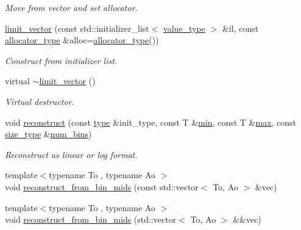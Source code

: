 \begin{DoxyCompactItemize}
\begin{DoxyCompactList}\small\item\em Move from vector and set allocator. \end{DoxyCompactList}\item 
\hyperlink{classIceBRG_1_1limit__vector_ac73207daaf033e6e4be9b028fa86b435}{limit\+\_\+vector} (const std\+::initializer\+\_\+list$<$ \hyperlink{classIceBRG_1_1limit__vector_a9b1e2f022c18b0227b25bb571741bb28}{value\+\_\+type} $>$ \&il, const \hyperlink{classIceBRG_1_1limit__vector_ac75a579f04baed676ee916b0ad3dfec0}{allocator\+\_\+type} \&alloc=\hyperlink{classIceBRG_1_1limit__vector_ac75a579f04baed676ee916b0ad3dfec0}{allocator\+\_\+type}())
\begin{DoxyCompactList}\small\item\em Construct from initializer list. \end{DoxyCompactList}\item 
virtual \hyperlink{classIceBRG_1_1limit__vector_a7464af68a55bc97d7303c2a393ed8722}{$\sim$limit\+\_\+vector} ()
\begin{DoxyCompactList}\small\item\em Virtual destructor. \end{DoxyCompactList}\item 
void \hyperlink{classIceBRG_1_1limit__vector_a8e81ad5d96b7593d54f52d94110e2ed8}{reconstruct} (const \hyperlink{classIceBRG_1_1limit__vector_a67ad5ccda3b716a3aca2fa6223e75681}{type} \&init\+\_\+type, const T \&\hyperlink{classIceBRG_1_1limit__vector_a6dddba344399189344e410ddca2615d6}{min}, const T \&\hyperlink{classIceBRG_1_1limit__vector_a4f020c6f3e092f6cbfdc3c015de83667}{max}, const \hyperlink{classIceBRG_1_1limit__vector_a81be3eb6cd519b3f5279ef735ccc4c2f}{size\+\_\+type} \&\hyperlink{classIceBRG_1_1limit__vector_af09ecb88fd55929c0b08faa63c9a3e1c}{num\+\_\+bins})
\begin{DoxyCompactList}\small\item\em Reconstruct as linear or log format. \end{DoxyCompactList}\item 
{\footnotesize template$<$typename To , typename Ao $>$ }\\void \hyperlink{classIceBRG_1_1limit__vector_ad3e63fd248648734c9694e8426c507df}{reconstruct\+\_\+from\+\_\+bin\+\_\+mids} (const std\+::vector$<$ To, Ao $>$ \&vec)
\item 
{\footnotesize template$<$typename To , typename Ao $>$ }\\void \hyperlink{classIceBRG_1_1limit__vector_a2f0e8cf8aa4e31b55453634ea90afd64}{reconstruct\+\_\+from\+\_\+bin\+\_\+mids} (std\+::vector$<$ To, Ao $>$ \&\&vec)

\end{DoxyCompactItemize}
